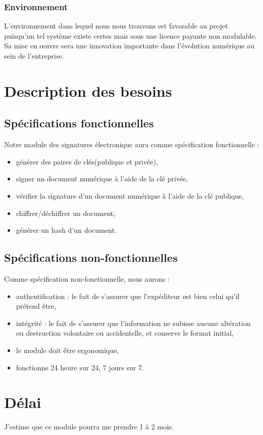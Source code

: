 \documentclass[12pt,a4paper]{article}
\begin{document}
	
		\subsubsection*{Environnement}
		
		 
		    L’environnement dans lequel nous nous trouvons est favorable au projet puisqu’un
tel système existe certes mais sous une licence payante non modulable. Sa mise en œuvre sera une innovation importante dans l’évolution numérique au sein de l'entreprise.

\section{Description des besoins}

	\subsection{Spécifications fonctionnelles}
	
	Notre module des signatures électronique aura comme spécification fonctionnelle :
	
	\begin{itemize}
		\item générer des paires de clés(publique et privée),
		\item signer un document numérique à l'aide de la clé privée,
		\item vérifier la signature d'un document numérique à l'aide de la clé publique,
		\item chiffrer/déchiffrer un document,
		\item générer un hash d'un document.
	\end{itemize}
		
	\subsection{Spécifications non-fonctionnelles}
	Comme spécification non-fonctionnelle, nous aurons :
	\begin{itemize}
		\item authentification : le fait de s'assurer que l'expéditeur est bien celui qu'il prétend être,
		\item intégrité : le fait de s'assurer que l'information ne subisse aucune altération ou destruction volontaire ou accidentelle, et conserve le format initial,
		\item le module doit être ergonomique,
		\item fonctionne 24 heure sur 24, 7 jours sur 7.
	\end{itemize}


\section{Délai}
	J'estime que ce module pourra me prendre 1 à 2 mois.

\end{document}
